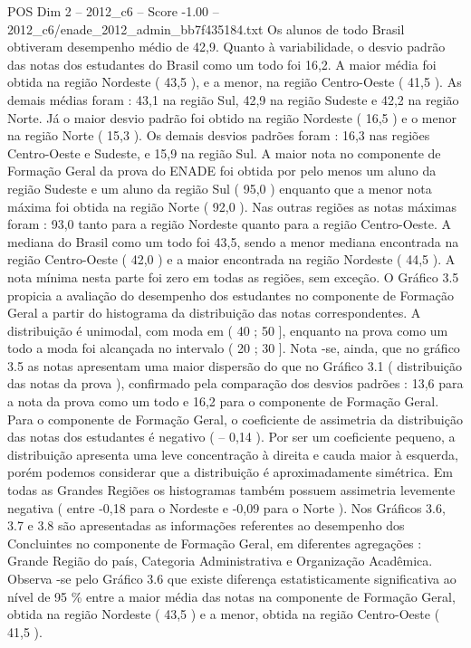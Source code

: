 \begin{textsample}{POS Dim 2 – 2012\_c6 – Score -1.00 – 2012\_c6/enade\_2012\_admin\_bb7f435184.txt}
Os alunos de todo Brasil obtiveram desempenho médio de 42,9.
Quanto à variabilidade, o desvio padrão das notas dos estudantes do Brasil como um todo foi 16,2.
A maior média foi obtida na região Nordeste ( 43,5 ), e a menor, na região Centro-Oeste ( 41,5 ).
As demais médias foram : 43,1 na região Sul, 42,9 na região Sudeste e 42,2 na região Norte.
Já o maior desvio padrão foi obtido na região Nordeste ( 16,5 ) e o menor na região Norte ( 15,3 ).
Os demais desvios padrões foram : 16,3 nas regiões Centro-Oeste e Sudeste, e 15,9 na região Sul.
A maior nota no componente de Formação Geral da prova do ENADE foi obtida por pelo menos um aluno da região Sudeste e um aluno da região Sul ( 95,0 ) enquanto que a menor nota máxima foi obtida na região Norte ( 92,0 ).
Nas outras regiões as notas máximas foram : 93,0 tanto para a região Nordeste quanto para a região Centro-Oeste.
A mediana do Brasil como um todo foi 43,5, sendo a menor mediana encontrada na região Centro-Oeste ( 42,0 ) e a maior encontrada na região Nordeste ( 44,5 ).
A nota mínima nesta parte foi zero em todas as regiões, sem exceção.
O Gráfico 3.5 propicia a avaliação do desempenho dos estudantes no componente de Formação Geral a partir do histograma da distribuição das notas correspondentes.
A distribuição é unimodal, com moda em ( 40 ; 50 ], enquanto na prova como um todo a moda foi alcançada no intervalo ( 20 ; 30 ].
Nota -se, ainda, que no gráfico 3.5 as notas apresentam uma maior dispersão do que no Gráfico 3.1 ( distribuição das notas da prova ), confirmado pela comparação dos desvios padrões : 13,6 para a nota da prova como um todo e 16,2 para o componente de Formação Geral.
Para o componente de Formação Geral, o coeficiente de assimetria da distribuição das notas dos estudantes é negativo ( – 0,14 ).
Por ser um coeficiente pequeno, a distribuição apresenta uma leve concentração à direita e cauda maior à esquerda, porém podemos considerar que a distribuição é aproximadamente simétrica.
Em todas as Grandes Regiões os histogramas também possuem assimetria levemente negativa ( entre -0,18 para o Nordeste e -0,09 para o Norte ).
Nos Gráficos 3.6, 3.7 e 3.8 são apresentadas as informações referentes ao desempenho dos Concluintes no componente de Formação Geral, em diferentes agregações : Grande Região do país, Categoria Administrativa e Organização Acadêmica.
Observa -se pelo Gráfico 3.6 que existe diferença estatisticamente significativa ao nível de 95 \% entre a maior média das notas na componente de Formação Geral, obtida na região Nordeste ( 43,5 ) e a menor, obtida na região Centro-Oeste ( 41,5 ).

\end{textsample}
